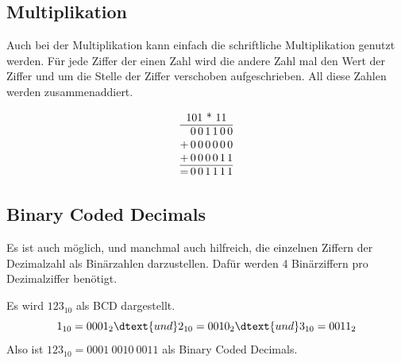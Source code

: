 \documentclass{article}
\begin{document}
\subsection{Multiplikation}
Auch bei der Multiplikation kann einfach die schriftliche Multiplikation genutzt werden. Für jede Ziffer der einen Zahl wird die andere Zahl mal den Wert der Ziffer und um die Stelle der Ziffer verschoben aufgeschrieben. All diese Zahlen werden zusammenaddiert.

\begin{zexample}%
\[
\begin{array}{@{}c@{\,}c@{\,}c@{\,}c@{\,}c@{\,}c@{\,}c@{}}
  \multicolumn{7}{c}{$101 * 11$} \\
  \hline
    & 0 & 0 & 1 & 1 & 0 & 0 \\
  + & 0 & 0 & 0 & 0 & 0 & 0 \\
  + & 0 & 0 & 0 & 0 & 1 & 1 \\
  \hline
  = & 0 & 0 & 1 & 1 & 1 & 1
\end{array}
\]
\end{zexample}

\subsection{Binary Coded Decimals}
Es ist auch möglich, und manchmal auch hilfreich, die einzelnen Ziffern der Dezimalzahl als Binärzahlen darzustellen. Dafür werden 4 Binärziffern pro Dezimalziffer benötigt.
\begin{zexample}%
Es wird $123_{10}$ als BCD dargestellt.
\[
 1_{10} = 0001_2 \dtext{und}
 2_{10} = 0010_2 \dtext{und}
 3_{10} = 0011_2
\]
Also ist $123_{10} = 0001\ 0010\ 0011$ als Binary Coded Decimals.
\end{zexample}
\end{document}
